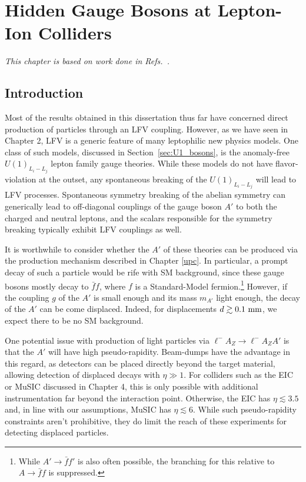 \chapter{Hidden Gauge Bosons at Lepton-Ion Colliders} \label{bosons}
\vspace{-1cm}
\begin{center}
{\it This chapter is based on work done in Refs.~\cite{Davoudiasl:2023pkq,Davoudiasl:2024fiz}.}
\end{center}
\vspace{1cm}

\section{Introduction}
Most of the results obtained in this dissertation thus far have concerned direct production of particles through an LFV coupling. However, as we have seen in Chapter 2, LFV is a generic feature of many leptophilic new physics models. One class of such models, discussed in Section~\ref{sec:U1_bosons}, is the anomaly-free $U(1)_{L_i - L_j}$ lepton family gauge theories. While these models do not have flavor-violation at the outset, any spontaneous breaking of the $U(1)_{L_i - L_j}$ will lead to LFV processes. Spontaneous symmetry breaking of the abelian symmetry can generically lead to off-diagonal couplings of the gauge boson $A'$ to both the charged and neutral leptons, and the scalars responsible for the symmetry breaking typically exhibit LFV couplings as well.

It is worthwhile to consider whether the $A'$ of these theories can be produced via the production mechanism described in Chapter \ref{upc}. In particular, a prompt decay of such a particle would be rife with SM background, since these gauge bosons mostly decay to $\bar{f}f$, where $f$ is a Standard-Model fermion.\footnote{While $A'\rightarrow \bar{f}f'$ is also often possible, the branching for this relative to $A\rightarrow \bar{f}f$ is suppressed.} However, if the coupling $g$ of the $A'$ is small enough and its mass $m_{A'}$ light enough, the decay of the $A'$ can be come displaced. Indeed, for displacements $d \gtrsim 0.1~{\rm mm}$, we expect there to be no SM background.

One potential issue with production of light particles via $\ell^- A_Z \rightarrow \ell^- A_Z A'$ is that the $A'$ will have high pseudo-rapidity. Beam-dumps have the advantage in this regard, as detectors can be placed directly beyond the target material, allowing detection of displaced decays with $\eta \gg 1$. For colliders such as the EIC or MuSIC discussed in Chapter 4, this is only possible with additional instrumentation far beyond the interaction point. Otherwise, the EIC has $\eta \lesssim 3.5$ and, in line with our assumptions, MuSIC has $\eta \lesssim 6$. While such pseudo-rapidity constraints aren't prohibitive, they do limit the reach of these experiments for detecting displaced particles.

